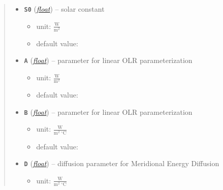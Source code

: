 \documentclass[letterpaper,10pt,english]{sphinxmanual}
\begin{document}
\begin{fulllineitems}
\begin{quote}
\begin{description}
\begin{itemize}
\begin{itemize}
\end{itemize}


\item {} 
\textbf{\texttt{S0}} (\href{http://docs.python.org/2.7/library/functions.html\#float}{\emph{float}}) -- 
solar constant
\begin{itemize}
\item {} 
unit: \(\frac{\textrm{W}}{\textrm{m}^2}\)

\item {} 
default value: 

\end{itemize}


\item {} 
\textbf{\texttt{A}} (\href{http://docs.python.org/2.7/library/functions.html\#float}{\emph{float}}) -- 
parameter for linear OLR parameterization
{\hyperref[api/climlab.radiation:climlab.radiation.AplusBT.AplusBT]{\emph{}}}
\begin{itemize}
\item {} 
unit: \(\frac{\textrm{W}}{\textrm{m}^2}\)

\item {} 
default value: 

\end{itemize}


\item {} 
\textbf{\texttt{B}} (\href{http://docs.python.org/2.7/library/functions.html\#float}{\emph{float}}) -- 
parameter for linear OLR parameterization
{\hyperref[api/climlab.radiation:climlab.radiation.AplusBT.AplusBT]{\emph{}}}
\begin{itemize}
\item {} 
unit: \(\frac{\textrm{W}}{\textrm{m}^2 \ ^{\circ} \textrm{C}}\)

\item {} 
default value: 

\end{itemize}


\item {} 
\textbf{\texttt{D}} (\href{http://docs.python.org/2.7/library/functions.html\#float}{\emph{float}}) -- 
diffusion parameter for Meridional Energy Diffusion
{\hyperref[api/climlab.dynamics:climlab.dynamics.diffusion.MeridionalDiffusion]{\emph{}}}
\begin{itemize}
\item {} 
unit: \(\frac{\textrm{W}}{\textrm{m}^2 \ ^{\circ} \textrm{C}}\)


\end{itemize}
\end{itemize}
\end{description}
\end{quote}
\end{fulllineitems}
\end{document}
